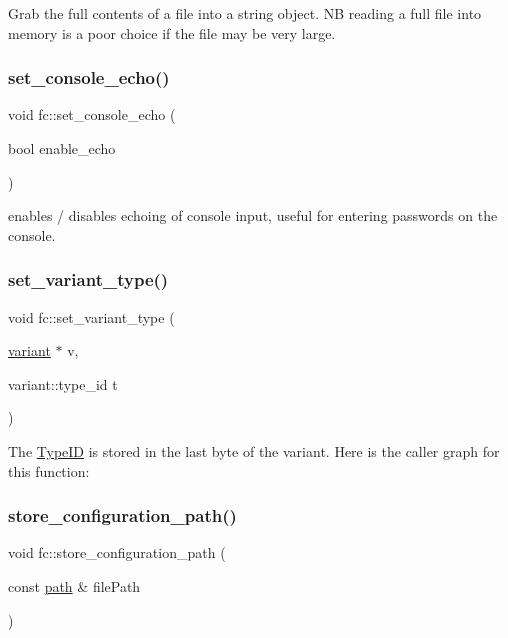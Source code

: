 Grab the full contents of a file into a string object. NB reading a full file into memory is a poor choice if the file may be very large. \mbox{\label{namespacefc_a3c65c900ae821804d7aab337ad41eac6}} 
\subsubsection{\texorpdfstring{set\+\_\+console\+\_\+echo()}{set\_console\_echo()}}
{\footnotesize\ttfamily void fc\+::set\+\_\+console\+\_\+echo (\begin{DoxyParamCaption}\item[{bool}]{enable\+\_\+echo }\end{DoxyParamCaption})}

enables / disables echoing of console input, useful for entering passwords on the console. \mbox{\label{namespacefc_a101ffbbefd2ddbb23eea290bbe9f87a1}} 
\subsubsection{\texorpdfstring{set\+\_\+variant\+\_\+type()}{set\_variant\_type()}}
{\footnotesize\ttfamily void fc\+::set\+\_\+variant\+\_\+type (\begin{DoxyParamCaption}\item[{\mbox{\hyperlink{classfc_1_1variant}{variant}} $\ast$}]{v,  }\item[{variant\+::type\+\_\+id}]{t }\end{DoxyParamCaption})}

The \mbox{\hyperlink{struct_type_i_d}{Type\+ID}} is stored in the \textquotesingle{}last byte\textquotesingle{} of the variant. Here is the caller graph for this function\+:
\mbox{\label{namespacefc_ab3fe255763535cb35384ce63a6514739}} 
\subsubsection{\texorpdfstring{store\+\_\+configuration\+\_\+path()}{store\_configuration\_path()}}
{\footnotesize\ttfamily void fc\+::store\+\_\+configuration\+\_\+path (\begin{DoxyParamCaption}\item[{const \mbox{\hyperlink{classfc_1_1path}{path}} \&}]{file\+Path }\end{DoxyParamCaption})}

